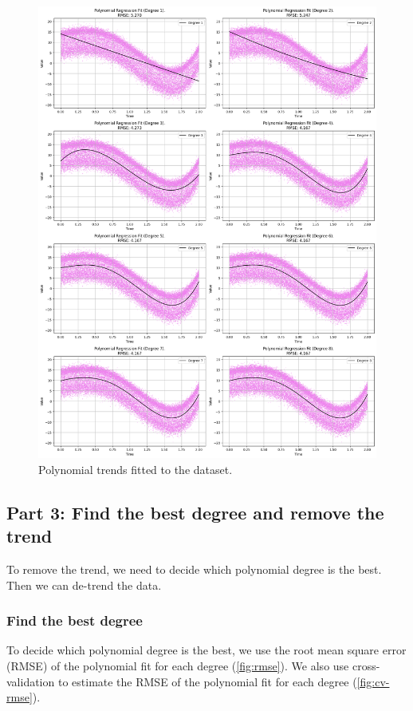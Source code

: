 \documentclass[a4paper]{article}
\begin{document}
\begin{figure}[htbp]
  \centering
  \includegraphics[width=\textwidth]{images/poly_trends.png}\caption{
    Polynomial trends fitted to the dataset.
  }\label{fig:poly-trend}
\end{figure}

\subsection*{Part 3: Find the best degree and remove the trend}

To remove the trend, we need to decide which polynomial degree is the best. Then we can de-trend the data.

\subsubsection*{Find the best degree}

To decide which polynomial degree is the best, we use the root mean square error (RMSE) of the polynomial fit for each degree (\ref{fig:rmse}). We also use cross-validation to estimate the RMSE of the polynomial fit for each degree (\ref{fig:cv-rmse}).
\end{document}

